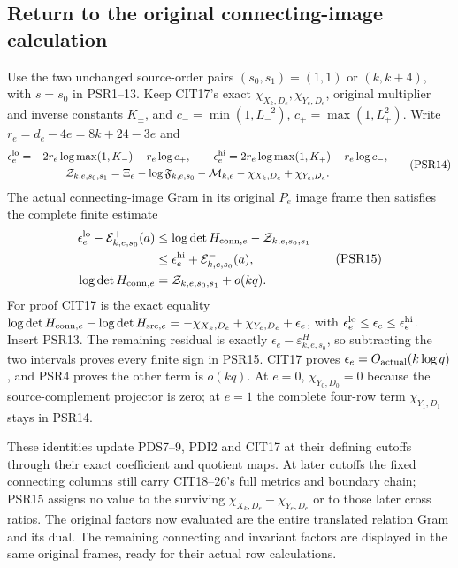 \documentclass[10pt]{article}
\begin{document}
\subsection{Return to the original connecting-image calculation}
Use the two unchanged source-order pairs $(s_0,s_1)=(1,1)$ or
$(k,k+4)$, with $s=s_0$ in PSR1--13. Keep CIT17's exact
$\chi_{X_k,D_e},\chi_{Y_e,D_e}$, original multiplier and inverse
constants $K_\pm$, and $c_-=\min(1,L_-^{-2})$,
$c_+=\max(1,L_+^2)$. Write $r_e=d_e-4e=8k+24-3e$ and
\[
\begin{gathered}
 \epsilon_e^{\rm lo}=-2r_e\log\max(1,K_-)-r_e\log c_+,\qquad
 \epsilon_e^{\rm hi}=2r_e\log\max(1,K_+)-r_e\log c_-,\\
 \mathcal Z_{k,e,s_0,s_1}
   =\Xi_e-\log\mathfrak F_{k,e,s_0}-\mathcal M_{k,e}
                         -\chi_{X_k,D_e}+\chi_{Y_e,D_e}.
\end{gathered}\tag{PSR14}
\]
The actual connecting-image Gram in its original $P_e$ image frame
then satisfies the complete finite estimate
\[
\begin{split}
 \epsilon_e^{\rm lo}-\mathcal E^+_{k,e,s_0}(a)
 &\le\log\det H_{{\rm conn},e}-\mathcal Z_{k,e,s_0,s_1}\\
 &\le\epsilon_e^{\rm hi}+\mathcal E^-_{k,e,s_0}(a),\\
 \log\det H_{{\rm conn},e}
 &=\mathcal Z_{k,e,s_0,s_1}+o(kq).
\end{split}\tag{PSR15}
\]
For proof CIT17 is the exact equality
$\log\det H_{{\rm conn},e}-\log\det H_{{\rm src},e}
=-\chi_{X_k,D_e}+\chi_{Y_e,D_e}+\epsilon_e$,
with $\epsilon_e^{\rm lo}\le\epsilon_e\le\epsilon_e^{\rm hi}$.
Insert PSR13. The remaining residual is exactly
$\epsilon_e-\varepsilon^H_{k,e,s_0}$, so subtracting the two
intervals proves every finite sign in PSR15.
CIT17 proves $\epsilon_e=O_{\rm actual}(k\log q)$, and PSR4
proves the other term is $o(kq)$. At $e=0$,
$\chi_{Y_0,D_0}=0$ because the source-complement projector is zero;
at $e=1$ the complete four-row term $\chi_{Y_1,D_1}$ stays in PSR14.

These identities update PDS7--9, PDI2 and CIT17 at their defining
cutoffs through their exact coefficient and quotient maps. At later
cutoffs the fixed connecting columns still carry CIT18--26's full
metrics and boundary chain; PSR15 assigns no value to the surviving
$\chi_{X_k,D_e}-\chi_{Y_e,D_e}$ or to those later cross ratios.
The original factors now evaluated are the entire translated relation
Gram and its dual. The remaining connecting and invariant factors are
displayed in the same original frames, ready for their actual row
calculations.
\end{document}
